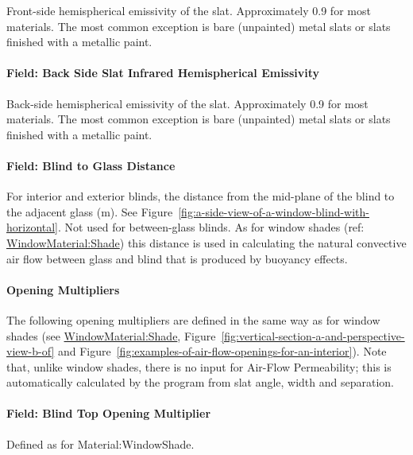 Front-side hemispherical emissivity of the slat. Approximately 0.9 for most materials. The most common exception is bare (unpainted) metal slats or slats finished with a metallic paint.

\paragraph{Field: Back Side Slat Infrared Hemispherical Emissivity}\label{field-back-side-slat-infrared-hemispherical-emissivity}

Back-side hemispherical emissivity of the slat. Approximately 0.9 for most materials. The most common exception is bare (unpainted) metal slats or slats finished with a metallic paint.

\paragraph{Field: Blind to Glass Distance}\label{field-blind-to-glass-distance}

For interior and exterior blinds, the distance from the mid-plane of the blind to the adjacent glass (m). See Figure~\ref{fig:a-side-view-of-a-window-blind-with-horizontal}. Not used for between-glass blinds. As for window shades (ref: \hyperref[windowmaterialshade]{WindowMaterial:Shade}) this distance is used in calculating the natural convective air flow between glass and blind that is produced by buoyancy effects.

\paragraph{Opening Multipliers}\label{opening-multipliers}

The following opening multipliers are defined in the same way as for window shades (see \hyperref[windowmaterialshade]{WindowMaterial:Shade}, Figure~\ref{fig:vertical-section-a-and-perspective-view-b-of} and Figure~\ref{fig:examples-of-air-flow-openings-for-an-interior}). Note that, unlike window shades, there is no input for Air-Flow Permeability; this is automatically calculated by the program from slat angle, width and separation.

\paragraph{Field: Blind Top Opening Multiplier}\label{field-blind-top-opening-multiplier}

Defined as for Material:WindowShade.

